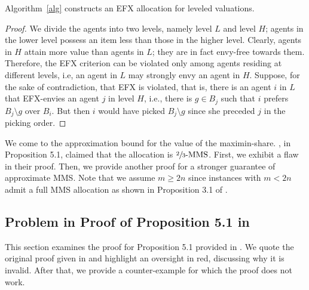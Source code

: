 \documentclass{article}
\theoremstyle{definition}
\begin{document}
\begin{theorem}
    Algorithm~\ref{alg} constructs an EFX allocation for leveled valuations. 
\end{theorem} 

\begin{proof}
    We divide the agents into two levels, namely level $L$ and level $H$; agents in the lower level possess an item less than those in the higher level. Clearly, agents in $H$ attain more value than agents in $L$; they are in fact envy-free towards them. Therefore, the EFX criterion can be  violated only among agents residing at different levels, i.e, an agent in $L$ may strongly envy an agent in $H$. Suppose, for the sake of contradiction, that EFX is violated, that is, there is an agent $i$ in $L$ that EFX-envies an agent $j$ in level $H$, i.e., there is $g \in B_j$ such that $i$ prefers $B_j \setminus g$ over $B_i$. But then $i$ would have picked $B_j \setminus g$ since she preceded $j$ in the picking order. 
\end{proof}


We come to the approximation bound for the value of the maximin-share. \cite{christodoulou2024fairtruthfulallocationsleveled}, in Proposition 5.1, claimed that the allocation is $\sfrac{2}{3}\text{-MMS}$. First, we exhibit a flaw in their proof. Then, we provide another proof for a stronger guarantee of approximate MMS. Note that we assume $m \ge 2n$ since instances with $m < 2n$ admit a full MMS allocation as shown in Proposition 3.1 of \cite{christodoulou2024fairtruthfulallocationsleveled}.

\subsection{Problem in Proof of Proposition 5.1 in \cite{christodoulou2024fairtruthfulallocationsleveled}}

This section examines the proof for Proposition 5.1 provided in \cite{christodoulou2024fairtruthfulallocationsleveled}. We quote the original proof given in \cite{christodoulou2024fairtruthfulallocationsleveled} and highlight an oversight in red, discussing why it is invalid. After that, we provide a counter-example for which the proof does not work. 

\vspace{5mm}
\end{document}
